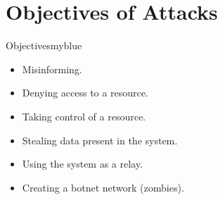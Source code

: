 \vspace{0.75cm}

\section{Objectives of Attacks}
\begin{prettyBox}{Objectives}{myblue}
\begin{itemize}
    \item Misinforming.
    \item Denying access to a resource.
    \item Taking control of a resource.
    \item Stealing data present in the system.
    \item Using the system as a relay.
    \item Creating a botnet network (zombies).
\end{itemize}
\end{prettyBox}

\newpage

